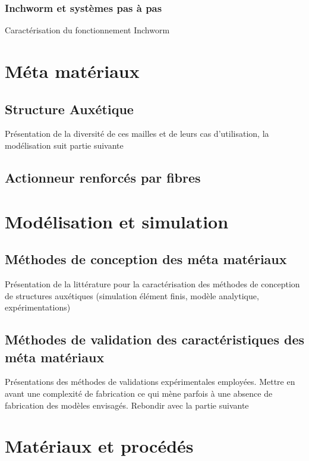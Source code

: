 \documentclass[10pt, a4paper]{article}
\begin{document}
        \subsubsection{Inchworm et systèmes pas à pas}
        Caractérisation du fonctionnement Inchworm

\section{Méta matériaux} 
    \subsection{Structure Auxétique}
    Présentation de la diversité de ces mailles et de leurs cas d'utilisation, la modélisation suit partie suivante
    \subsection{Actionneur renforcés par fibres}

\section{Modélisation et simulation} 
    \subsection{Méthodes de conception des méta matériaux}
        Présentation de la littérature pour la caractérisation des méthodes de conception de structures auxétiques (simulation élément finis, modèle analytique, expérimentations)
    \subsection{Méthodes de validation des caractéristiques des méta matériaux}
        Présentations des méthodes de validations expérimentales employées. Mettre en avant une complexité de fabrication ce qui mène parfois à une absence de fabrication des modèles envisagés. Rebondir avec la partie suivante
        
\section{Matériaux et procédés} 
\end{document}
